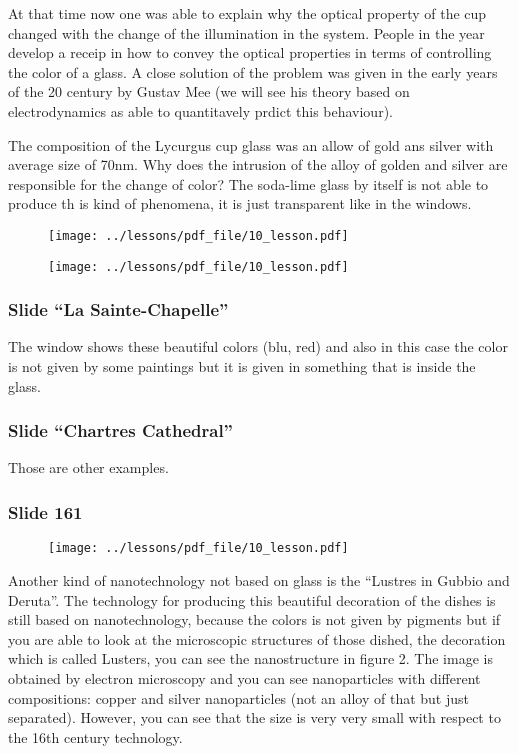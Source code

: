\documentclass[../main/main.tex]{subfiles}
\begin{document}
At that time now one was able to explain why the optical property of the cup changed with the change of the illumination in the system. People in the year develop a receip in how to convey the optical properties in terms of controlling the color of a glass.
A close solution of the problem was given in the early years of the 20 century by Gustav Mee (we will see his theory based on electrodynamics as able to quantitavely prdict this behaviour).


The composition of the Lycurgus cup glass was an allow of gold ans silver with average size of 70nm.
Why does the intrusion of the alloy of golden and silver are responsible for the change of color? The soda-lime glass by itself is not able to produce th is kind of phenomena, it is just transparent like in the windows.

\newpage

\begin{figure}[h!]
\centering
\texttt{[image: ../lessons/pdf\_file/10\_lesson.pdf]}
\end{figure}


\begin{figure}[h!]
\centering
\texttt{[image: ../lessons/pdf\_file/10\_lesson.pdf]}
\end{figure}

\subsubsection{Slide “La Sainte-Chapelle”}
The window shows these beautiful colors (blu, red) and also in this case the color is not given by some paintings but it is given in something that is inside the glass.

\subsubsection{Slide “Chartres Cathedral”}
Those are other examples.


\newpage

\subsubsection{Slide 161}

\begin{figure}[h!]
\centering
\texttt{[image: ../lessons/pdf\_file/10\_lesson.pdf]}
\end{figure}

Another kind of nanotechnology not based on glass is the “Lustres in Gubbio and Deruta”. The technology for producing this beautiful decoration of the dishes is still based on nanotechnology, because the colors is not given by pigments but if you are able to look at the microscopic structures of those dished, the decoration which is called Lusters, you can see the nanostructure in figure 2. The image is obtained by electron microscopy and you can see nanoparticles with different compositions: copper and silver nanoparticles (not an alloy of that but just separated). However, you can see that the size is very very small with respect to the 16th century technology.
\end{document}
